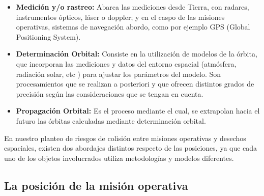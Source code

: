 \begin{itemize}
\itemsep0em
 \item {\bf{Medici\'on y/o rastreo:}} Abarca las mediciones desde Tierra, con radares, instrumentos \'opticos, l\'aser o doppler; y en el caspo de las misiones operativas, sistemas de navegaci\'on abordo, como por ejemplo GPS (Global Positioning System).\\
 \item {\bf{Determinaci\'on Orbital:}} Consiste en la utilizaci\'on de modelos de la \'orbita, que incorporan las mediciones y datos del entorno espacial (atm\'osfera, radiaci\'on solar, etc ) para ajustar los par\'ametros del modelo. Son procesamientos que se realizan a posteriori y que ofrecen distintos grados de precisión seg\'un las consideraciones que se tengan en cuenta.\
 \item {\bf{Propagaci\'on Orbital:}} Es el proceso mediante el cual, se extrapolan hacia el futuro las \'orbitas calculadas mediante determinaci\'on orbital.\\
\end{itemize}


En nuestro planteo de riesgos de colisi\'on entre misiones operativas y desechos espaciales, existen dos abordajes distintos respecto de las posiciones, ya que cada uno de los objetos involucrados utiliza metodolog\'ias y modelos diferentes.

\subsection{La posici\'on de la misi\'on operativa}

